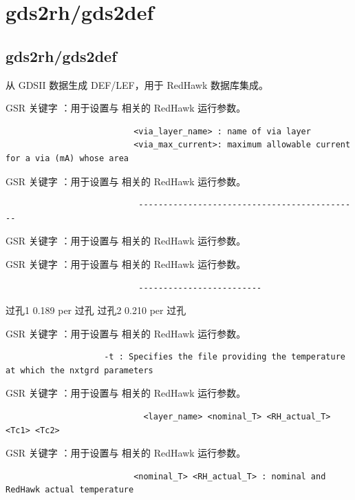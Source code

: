 \section{gds2rh/gds2def}
\subsection*{gds2rh/gds2def}

从 GDSII 数据生成 DEF/LEF，用于 RedHawk 数据库集成。

GSR 关键字 ：用于设置与  相关的 RedHawk 运行参数。

\begin{lstlisting}
                          <via_layer_name> : name of via layer
                          <via_max_current>: maximum allowable current for a via (mA) whose area
\end{lstlisting}

GSR 关键字 ：用于设置与  相关的 RedHawk 运行参数。

\begin{lstlisting}
                           ---------------------------------------------
\end{lstlisting}

GSR 关键字 ：用于设置与  相关的 RedHawk 运行参数。

GSR 关键字 ：用于设置与  相关的 RedHawk 运行参数。

\begin{lstlisting}
                           -------------------------
\end{lstlisting}

过孔1 0.189 per 过孔 过孔2 0.210 per 过孔

GSR 关键字 ：用于设置与  相关的 RedHawk 运行参数。

\begin{lstlisting}
                    -t : Specifies the file providing the temperature at which the nxtgrd parameters
\end{lstlisting}

GSR 关键字 ：用于设置与  相关的 RedHawk 运行参数。

\begin{lstlisting}
                            <layer_name> <nominal_T> <RH_actual_T> <Tc1> <Tc2>
\end{lstlisting}

GSR 关键字 ：用于设置与  相关的 RedHawk 运行参数。

\begin{lstlisting}
                          <nominal_T> <RH_actual_T> : nominal and RedHawk actual temperature
\end{lstlisting}

